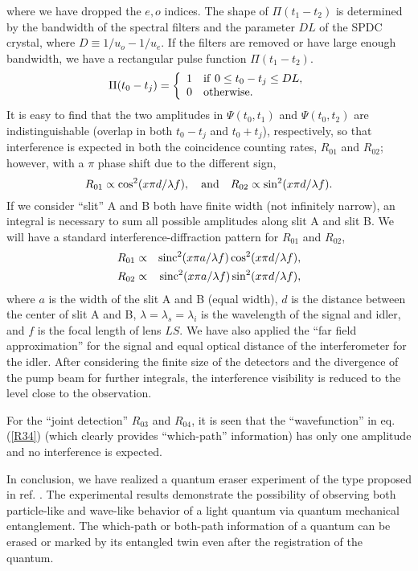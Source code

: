 where we have dropped the $e,o$ indices. The shape of $\Pi(t_{1}-t_{2})$ is determined by
the bandwidth of the spectral filters and the parameter $DL$ of the SPDC crystal, where
$D\equiv 1/u_{o}-1/u_{e}$. If the filters are removed or have large enough bandwidth, we
have a rectangular pulse function $\Pi(t_{1}-t_{2})$.
\[
\Pi(t_0-t_j) =
    \left\{
        \begin{array}{ll}
            1 & {\rm if~} 0\leq t_{0}-t_{j}\leq DL , \\
            0 & {\rm otherwise}.
        \end{array}
    \right.
\]
It is easy to find that the two amplitudes in $\Psi(t_{0}, t_{1})$ and $\Psi(t_{0},
t_{2})$ are indistinguishable (overlap in both $t_{0}-t_{j}$ and $t_{0}+t_{j}$),
respectively, so that interference is expected in both the coincidence counting rates,
$R_{01}$ and $R_{02}$; however, with a $\pi$ phase shift due to the different sign,
\[
R_{01}\propto \cos ^{2}(x\pi d/\lambda f),\quad {\rm and} \quad R_{02}\propto \sin
^{2}(x\pi d/\lambda f).
\]
If we consider ``slit'' A and B both have finite width (not infinitely narrow), an
integral is necessary to sum all possible amplitudes along slit
A and slit B. We will have a standard interference-diffraction pattern for $%
R_{01}$ and $R_{02}$,
\begin{eqnarray}
R_{01} &\propto&{\rm sinc}^{2}(x\pi a/\lambda f)\cos^{2}(x\pi d/\lambda f) , \nonumber \\
R_{02} &\propto&{\rm sinc}^{2}(x\pi a/\lambda f)\sin^{2}(x\pi d/\lambda f) ,\label{R0102}
\end{eqnarray}
where $a$ is the width of the slit A and B (equal width), $d$ is the distance between the
center of slit A and B, $\lambda =\lambda_{s}=\lambda_{i}$ is the wavelength of the
signal and idler, and $f$ is the focal length of lens $LS$. We have also applied the
``far field approximation'' for the signal and equal optical distance of the
interferometer for the idler. After considering the finite size of the detectors and the
divergence of the pump beam for further integrals, the interference visibility is reduced
to the level close to the observation.

For the ``joint detection'' $R_{03}$ and $R_{04}$, it is seen that the ``wavefunction''
in eq.(\ref{R34}) (which clearly provides ``which-path'' information) has only one
amplitude and no interference is expected.


In conclusion, we have realized a quantum eraser experiment of the type proposed in ref.
\cite{Scully}. The experimental results demonstrate the possibility of observing both
particle-like and wave-like behavior of a light quantum via quantum mechanical
entanglement. The which-path or both-path information of a quantum can be erased or
marked by its entangled twin even after the registration of the quantum.

